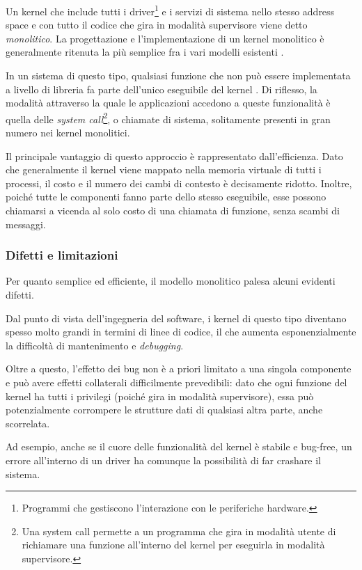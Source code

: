 \documentclass[12pt,a4paper]{report}
\begin{document}
			Un kernel che include tutti i driver\footnote{Programmi che gestiscono l'interazione con le periferiche hardware.} e i servizi di sistema
			nello stesso address space e con tutto il codice che gira in modalità supervisore viene detto \emph{monolitico}.
			La progettazione e l'implementazione di un kernel monolitico è generalmente ritenuta la più semplice fra i vari modelli esistenti \cite{DiBona}.
			
			In un sistema di questo tipo, qualsiasi funzione che non può essere implementata a livello di libreria fa parte
			dell'unico eseguibile del kernel \cite{WIKI_Kernel}. Di riflesso, la modalità attraverso la quale le applicazioni
			accedono a queste funzionalità è quella delle \emph{system call}\footnote{Una system call permette a un programma che
			gira in modalità utente di richiamare una funzione all'interno del kernel per eseguirla in modalità supervisore.}, o chiamate di sistema,
			solitamente presenti in gran numero nei kernel monolitici.
			
			Il principale vantaggio di questo approccio è rappresentato dall'efficienza. Dato che generalmente il kernel viene mappato
			nella memoria virtuale di tutti i processi, il costo e il numero dei cambi di contesto è decisamente ridotto. Inoltre, poiché
			tutte le componenti fanno parte dello stesso eseguibile, esse possono chiamarsi a vicenda al solo costo di una chiamata
			di funzione, senza scambi di messaggi.
			
			\subsubsection{Difetti e limitazioni}
				Per quanto semplice ed efficiente, il modello monolitico palesa alcuni evidenti difetti.
			
				Dal punto di vista dell'ingegneria del software, i kernel di questo tipo diventano spesso molto grandi in termini di
				linee di codice, il che aumenta esponenzialmente la difficoltà di mantenimento e \emph{debugging}.
			
				Oltre a questo, l'effetto dei bug non è a priori limitato a una singola componente e può avere effetti collaterali
				difficilmente prevedibili: dato che ogni funzione del kernel ha tutti i privilegi (poiché gira in modalità supervisore),
				essa può potenzialmente corrompere le strutture dati di qualsiasi altra parte, anche scorrelata.
			
				Ad esempio, anche se il cuore delle funzionalità del kernel è stabile e bug-free, un errore all'interno di un driver
				ha comunque la possibilità di far crashare il sistema.
					
\end{document}
